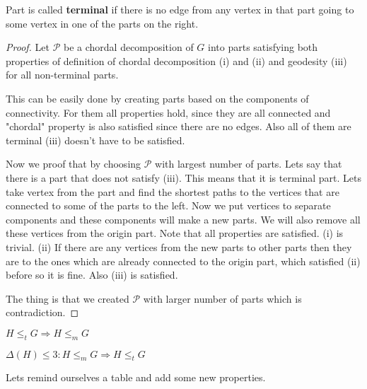 \begin{defn}
	Part is called \textbf{terminal} if there is no edge from any vertex in that part going to some vertex in one of the parts on the right.
\end{defn}

\begin{proof}
	Let $\mathcal{P}$ be a chordal decomposition of $G$ into parts satisfying both properties of definition of chordal decomposition (i) and (ii) and geodesity (iii) for all non-terminal parts.
	
	This can be easily done by creating parts based on the components of connectivity. For them all properties hold, since they are all connected and "chordal" property is also satisfied since there are no edges. Also all of them are terminal (iii) doesn't have to be satisfied.
	
	Now we proof that by choosing $\mathcal{P}$ with largest number of parts. Lets say that there is a part that does not satisfy (iii). This means that it is terminal part. Lets take vertex from the part and find the shortest paths to the vertices that are connected to some of the parts to the left. Now we put vertices to separate components and these components will make a new parts. We will also remove all these vertices from the origin part. Note that all properties are satisfied. (i) is trivial. (ii) If there are any vertices from the new parts to other parts then they are to the ones which are already connected to the origin part, which satisfied (ii) before so it is fine. Also (iii) is satisfied.
	
	The thing is that we created $\mathcal{P}$ with larger number of parts which is contradiction.
\end{proof}

\begin{observ}
	$H \leq_{t} G \Rightarrow H \leq_{m} G$
\end{observ}

\begin{observ}
	$\Delta (H) \leq 3 : H \leq_{m} G \Rightarrow H \leq_{t} G$
\end{observ}

Lets remind ourselves a table and add some new properties.

